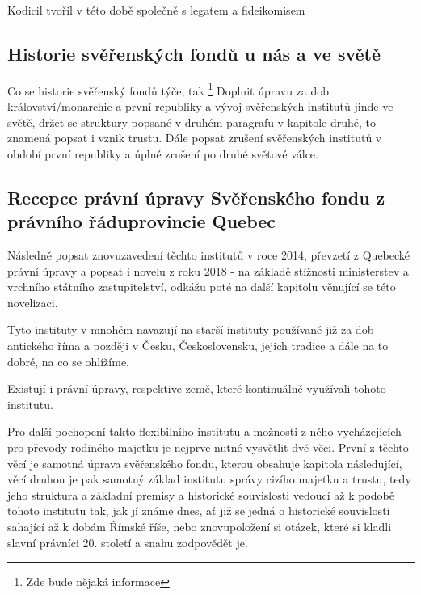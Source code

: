 \documentclass{article}
\begin{document}
Kodicil tvořil v této době společně s legatem a fideikomisem 

\newpage

\subsection{Historie svěřenských fondů u nás a ve světě}

Co se historie svěřenský fondů týče, tak \footnote[4]{Zde bude nějaká informace}
Doplnit úpravu za dob království/monarchie a první republiky a vývoj svěřenských institutů jinde ve světě, držet se struktury popsané v druhém paragrafu v kapitole druhé, to znamená popsat i vznik trustu.
Dále popsat zrušení svěřenských institutů v období první republiky a úplné zrušení po druhé světové válce.

\subsection{Recepce právní úpravy Svěřenského fondu z právního řáduprovincie Quebec}

 Následně popsat znovuzavedení těchto institutů v roce 2014, převzetí z Quebecké právní úpravy a popsat i novelu z roku 2018 - na základě stížnosti ministerstev a vrchního státního zastupitelství, odkážu poté na další kapitolu věnující se této novelizaci.
 
 Tyto instituty v mnohém navazují na starší instituty používané již za dob antického říma a později v Česku, Československu, jejich tradice a dále na to dobré, na co se ohlížíme.
 
 Existují i právní úpravy, respektive země, které kontinuálně využívali tohoto institutu.
 
 Pro další pochopení takto flexibilního institutu a možnosti z něho vycházejících pro převody rodiného majetku je nejprve nutné vysvětlit dvě věci. První z těchto věcí je samotná úprava svěřenského fondu, kterou obsahuje kapitola následující, věcí druhou je pak samotný základ institutu správy cizího majetku a trustu, tedy jeho struktura a základní premisy a historické souvislosti vedoucí až k podobě tohoto institutu tak, jak jí známe dnes, ať již se jedná o historické souvislosti sahající až k dobám Římské říše, nebo znovupoložení si otázek, které si kladli slavní právníci 20. století a snahu zodpovědět je.
\end{document}
